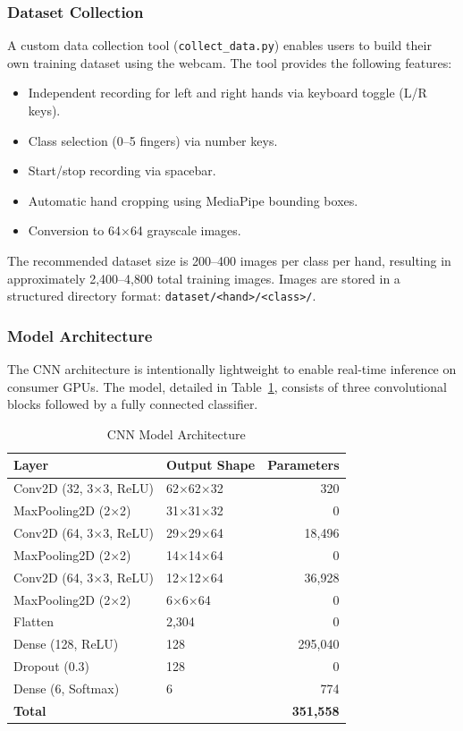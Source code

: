 \documentclass[conference]{IEEEtran}
\begin{document}
\subsubsection{Dataset Collection}

A custom data collection tool (\texttt{collect\_data.py}) enables users to build their own training dataset using the webcam. The tool provides the following features:

\begin{itemize}
\item Independent recording for left and right hands via keyboard toggle (L/R keys).
\item Class selection (0--5 fingers) via number keys.
\item Start/stop recording via spacebar.
\item Automatic hand cropping using MediaPipe bounding boxes.
\item Conversion to 64$\times$64 grayscale images.
\end{itemize}

The recommended dataset size is 200--400 images per class per hand, resulting in approximately 2,400--4,800 total training images. Images are stored in a structured directory format: \texttt{dataset/<hand>/<class>/}.

\subsubsection{Model Architecture}

The CNN architecture is intentionally lightweight to enable real-time inference on consumer GPUs. The model, detailed in Table~\ref{tab:model}, consists of three convolutional blocks followed by a fully connected classifier.

\begin{table}[htbp]
\caption{CNN Model Architecture}
\label{tab:model}
\centering
\begin{tabular}{llr}
\toprule
\textbf{Layer} & \textbf{Output Shape} & \textbf{Parameters} \\
\midrule
Conv2D (32, 3$\times$3, ReLU) & 62$\times$62$\times$32 & 320 \\
MaxPooling2D (2$\times$2) & 31$\times$31$\times$32 & 0 \\
Conv2D (64, 3$\times$3, ReLU) & 29$\times$29$\times$64 & 18,496 \\
MaxPooling2D (2$\times$2) & 14$\times$14$\times$64 & 0 \\
Conv2D (64, 3$\times$3, ReLU) & 12$\times$12$\times$64 & 36,928 \\
MaxPooling2D (2$\times$2) & 6$\times$6$\times$64 & 0 \\
Flatten & 2,304 & 0 \\
Dense (128, ReLU) & 128 & 295,040 \\
Dropout (0.3) & 128 & 0 \\
Dense (6, Softmax) & 6 & 774 \\
\midrule
\textbf{Total} & & \textbf{351,558} \\
\bottomrule
\end{tabular}
\end{table}
\end{document}
